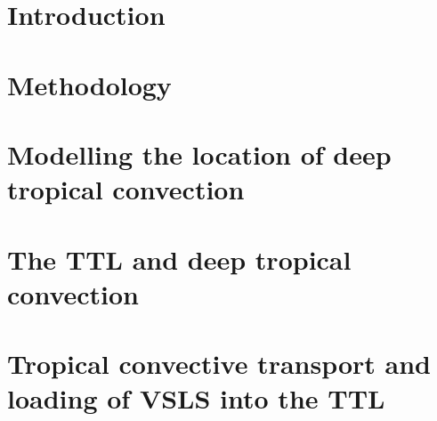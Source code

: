 \documentclass[12pt,a4paper,twoside]{report}
\begin{document}
\newpage                     %
\setcounter{page}{1}         %
\setcounter{chapter}{0}      %
\def\thepage{\arabic{page}}  %

\fancyhead[RE]{\textit{\thechapter ~ \nouppercase\leftmark}}
\fancyhead[LO]{\textit{\thesection ~ \nouppercase\rightmark}}

\chapter{Introduction}
\label{ch:chapter1}









\chapter{Methodology}
\label{ch:chapter2}




\chapter{Modelling the location of deep tropical convection}
\label{ch:chapter3}






\chapter{The TTL and deep tropical convection}
\label{ch:chapter4}






\chapter{Tropical convective transport and loading of VSLS into the TTL}
\label{ch:chapter5}







\end{document}
